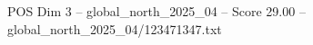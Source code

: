 \begin{textsample}{POS Dim 3 – global\_north\_2025\_04 – Score 29.00 – global\_north\_2025\_04/123471347.txt}
\end{textsample}
